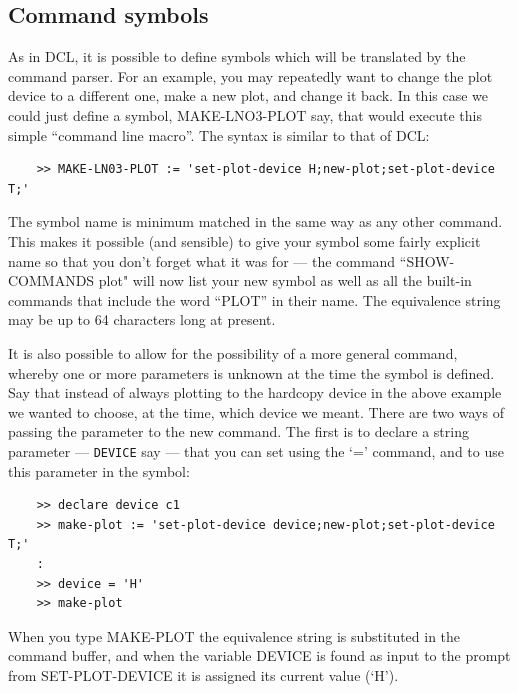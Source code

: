 \documentclass[11pt,twoside]{report}
\begin{document}
\subsection{Command symbols}

As in DCL, it is possible to define symbols which will be translated
by the command parser. For an example, you may repeatedly want to change the
plot device to a different one, make a new plot, and change it back. In this
case we could just define a symbol, MAKE-LNO3-PLOT say, that would execute this
simple ``command line macro''. The syntax is similar
to that of DCL: 
\begin{verbatim}
    >> MAKE-LN03-PLOT := 'set-plot-device H;new-plot;set-plot-device T;'
\end{verbatim}

The symbol name is minimum matched in the
same way as any other command. This makes it possible (and sensible) to give
your symbol some fairly explicit name so that you don't forget what it was for
--- the command ``SHOW-COMMANDS plot" will now list your new symbol as well as
all the built-in commands that include the word ``PLOT'' in their name. The
equivalence string may be up to
64 characters long at present. 

It is also possible to allow for the possibility of a more general command,
whereby one or more parameters is unknown at the time the symbol is
defined. Say that instead of always
plotting to the hardcopy device in the above example we wanted to choose, at
the time, which device we meant. There are two ways of passing the parameter to
the new command. The first is to declare a string parameter --- \verb+DEVICE+
say --- that you can set using the `=' command, and to use this parameter in
the symbol: 
\begin{verbatim}
    >> declare device c1
    >> make-plot := 'set-plot-device device;new-plot;set-plot-device T;'
    :
    >> device = 'H'
    >> make-plot
\end{verbatim}
When you type MAKE-PLOT the equivalence string is substituted in the command
buffer, and when the variable DEVICE is found as input to the prompt from
SET-PLOT-DEVICE it is assigned its current value (`H').
\end{document}
